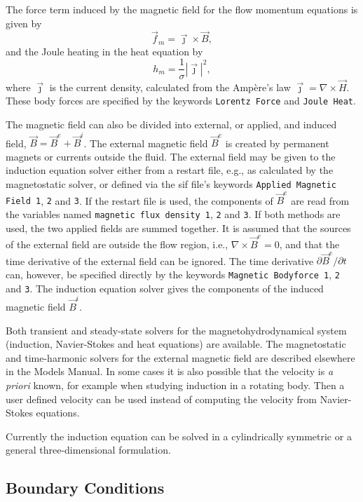 The force term induced by the magnetic field for the flow momentum equations
is given by
\begin{equation}
\vec{f}_m = \vec{\jmath}\times\vec{B},
\end{equation}
and the Joule heating in the heat equation by
\begin{equation}
h_m = \frac{1}{\sigma}\left|\vec{\jmath}\right|^2,
\end{equation}
where $\vec{\jmath}$ is the current density, calculated from the Amp\`{e}re's
law $\vec{\jmath}=\nabla\times\vec{H}$. These body forces are specified by
the keywords {\tt Lorentz Force} and {\tt Joule Heat}.

The magnetic field can also be divided into external, or applied, and induced
field, $\vec{B}=\vec{B}^e+\vec{B}^i$. The external magnetic field $\vec{B}^e$
is created by permanent magnets or currents outside the fluid. The external
field may be given to the induction equation solver either from a restart file,
e.g., as calculated by the magnetostatic solver, or defined via the sif file's
keywords {\tt Applied Magnetic Field 1}, {\tt 2} and {\tt 3}. If the
restart file is used, the components of $\vec{B}^e$ are read from the variables
named {\tt magnetic flux density 1}, {\tt 2} and {\tt 3}. If both methods are
used, the two applied fields are summed together. It is assumed that the
sources of the external field are outside the flow region, i.e.,
$\nabla\times\vec{B}^e=0$, and that the time derivative of the external field
can be ignored. The time derivative $\partial\vec{B}^e/\partial t$ can,
however, be specified directly by the keywords {\tt Magnetic Bodyforce 1},
{\tt 2} and {\tt 3}. The induction
equation solver gives the components of the induced magnetic field $\vec{B}^i$.

Both transient and steady-state solvers for the magnetohydrodynamical
system (induction, Navier-Stokes and heat equations) are available. The
magnetostatic and time-harmonic solvers for the external magnetic field are
described elsewhere in the Models Manual. In some cases it is also
possible that the velocity is {\em a priori} known, for example when
studying induction in a rotating body. Then a user defined velocity
can be used instead of computing the velocity from Navier-Stokes
equations.

Currently the induction equation can be solved in a cylindrically symmetric or
a general three-dimensional formulation.

\subsection{Boundary Conditions}

